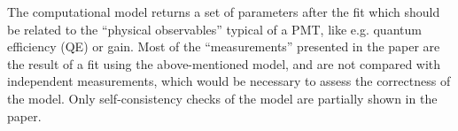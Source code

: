 \documentclass[11pt]{report}
\begin{document}
\newpage
\begin{tcolorbox}[enlarge top by=2em,colbacktitle=red!60!white,colframe=black!80!white,left=0pt,right=0pt,top=0pt,bottom=0pt,boxrule=0.3pt,title=\bfseries2.09]
The computational model returns a set of parameters after the fit which should be related to the ``physical observables'' typical of a PMT, like e.g. quantum efficiency (QE) or gain. Most of the ``measurements'' presented in the paper are the result of a fit using the above-mentioned model, and are not compared with independent measurements, which would be necessary to assess the correctness of the model. Only self-consistency checks of the model are partially shown in the paper. 
\end{tcolorbox}
\end{document}
